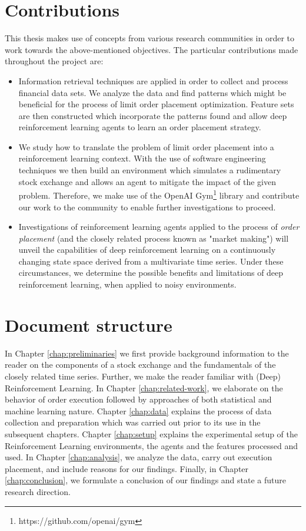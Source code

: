 \section{Contributions}

This thesis makes use of concepts from various research communities in order to work towards the above-mentioned objectives.
The particular contributions made throughout the project are:
\begin{itemize}
    \item Information retrieval techniques are applied in order to collect and process financial data sets.
    We analyze the data and find patterns which might be beneficial for the process of limit order placement optimization.
    Feature sets are then constructed which incorporate the patterns found and allow deep reinforcement learning agents to learn an order placement strategy.
    \item We study how to translate the problem of limit order placement into a reinforcement learning context.
    With the use of software engineering techniques we then build an environment which simulates a rudimentary stock exchange and allows an agent to mitigate the impact of the given problem.
    Therefore, we make use of the OpenAI Gym\footnote{https://github.com/openai/gym} library and contribute our work to the community to enable further investigations to proceed.
    \item Investigations of reinforcement learning agents applied to the process of \textit{order placement} (and the closely related process known as "market making") will unveil the capabilities of deep reinforcement learning on a continuously changing state space derived from a multivariate time series.
    Under these circumstances, we determine the possible benefits and limitations of deep reinforcement learning, when applied to noisy environments.
\end{itemize}

\section{Document structure}

In Chapter \ref{chap:preliminaries} we first provide background information to the reader on the components of a stock exchange and the fundamentals of the closely related time series.
Further, we make the reader familiar with (Deep) Reinforcement Learning.
In Chapter \ref{chap:related-work}, we elaborate on the behavior of order execution followed by approaches of both statistical and machine learning nature.
Chapter \ref{chap:data} explains the process of data collection and preparation which was carried out prior to its use in the subsequent chapters.
Chapter \ref{chap:setup} explains the experimental setup of the Reinforcement Learning environments, the agents and the features processed and used.
In Chapter \ref{chap:analysis}, we analyze the data, carry out execution placement, and include reasons for our findings.
Finally, in Chapter \ref{chap:conclusion}, we formulate a conclusion of our findings and state a future research direction.
